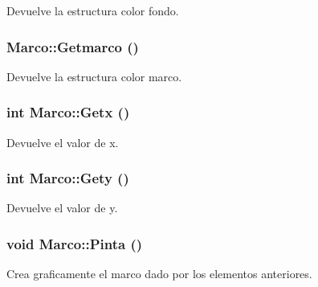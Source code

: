 Devuelve la estructura color fondo. 

\hypertarget{class_marco_2a8add5daf49790fdec1a6cc0013725f}{
\subsubsection[{Getmarco}]{ Marco::Getmarco ()}}
\label{class_marco_2a8add5daf49790fdec1a6cc0013725f}


Devuelve la estructura color marco. 

\hypertarget{class_marco_2dca8a6f891be78f7a54798a3baa2665}{
\subsubsection[{Getx}]{\setlength{\rightskip}{0pt plus 5cm}int Marco::Getx ()}}
\label{class_marco_2dca8a6f891be78f7a54798a3baa2665}


Devuelve el valor de x. 

\hypertarget{class_marco_075db8ed5a143de9ff1d82c75a79c55a}{
\subsubsection[{Gety}]{\setlength{\rightskip}{0pt plus 5cm}int Marco::Gety ()}}
\label{class_marco_075db8ed5a143de9ff1d82c75a79c55a}


Devuelve el valor de y. 

\hypertarget{class_marco_c22cd3f463bd42ee1f0ff005f1780251}{
\subsubsection[{Pinta}]{\setlength{\rightskip}{0pt plus 5cm}void Marco::Pinta ()}}
\label{class_marco_c22cd3f463bd42ee1f0ff005f1780251}


Crea graficamente el marco dado por los elementos anteriores. 



